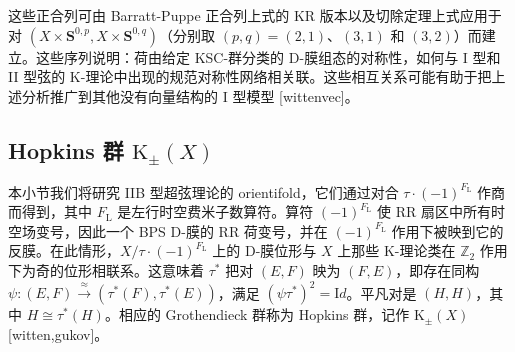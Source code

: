 \documentclass[11pt,a4paper]{ctexart}
\newcommand{\SrcRange}[2]{\marginpar{\raggedright\footnotesize 原文 p.#1}}
\begin{document}
这些正合列可由 Barratt-Puppe 正合列上式的 KR 版本以及切除定理上式应用于对 \((X\times{\mathbf S}^{0,p},X\times{\mathbf S}^{0,q})\)（分别取 \((p,q)=(2,1)\)、\((3,1)\) 和 \((3,2)\)）而建立。这些序列说明：荷由给定 KSC-群分类的 D-膜组态的对称性，如何与 I 型和 II 型弦的 K-理论中出现的规范对称性网络相关联。这些相互关系可能有助于把上述分析推广到其他没有向量结构的 I 型模型 [wittenvec]。

\SrcRange{81}{81}
\subsection{\texorpdfstring{Hopkins 群 \({\mathrm K}_{\pm}(X)\)}{Hopkins 群 \{\textbackslash mathrm K\}\_\{\textbackslash pm\}(X)}}\label{hopkins-ux7fa4-mathrm-k_pmx}

本小节我们将研究 IIB 型超弦理论的 orientifold，它们通过对合 \(\tau\cdot{(-1)^{F_{\mathrm L}}}\) 作商而得到，其中 \(F_{\mathrm L}\) 是左行时空费米子数算符。算符 \({(-1)^{F_{\mathrm L}}}\) 使 RR 扇区中所有时空场变号，因此一个 BPS D-膜的 RR 荷变号，并在 \({(-1)^{F_{\mathrm L}}}\) 作用下被映到它的反膜。在此情形，\(X/\tau\cdot{(-1)^{F_{\mathrm L}}}\) 上的 D-膜位形与 \(X\) 上那些 K-理论类在 \({\mathbb{Z}}_2\) 作用下为奇的位形相联系。这意味着 \(\tau^*\) 把对 \((E,F)\) 映为 \((F,E)\)，即存在同构 \(\psi:(E,F)\stackrel{\approx}{\longrightarrow}(\tau^*(F),\tau^*(E))\)，满足 \((\psi\tau^*)^2={\mathrm Id}\)。平凡对是 \((H,H)\)，其中 \(H\cong\tau^*(H)\)。相应的 Grothendieck 群称为 Hopkins 群，记作 \({\mathrm K}_{\pm}(X)\) [witten,gukov]。
\end{document}
